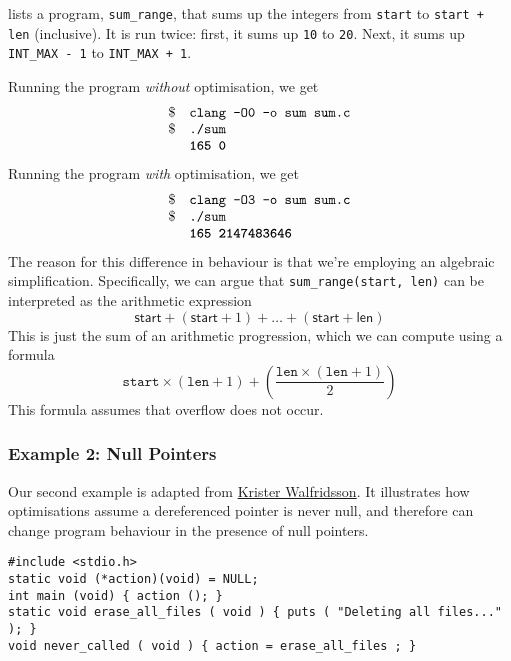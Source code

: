 lists a program, \texttt{sum\_range}, that sums up the integers from \texttt{start} to \texttt{start + len} (inclusive). It is run twice: first, it sums up \texttt{10} to \texttt{20}. Next, it sums up \texttt{INT\_MAX - 1} to \texttt{INT\_MAX + 1}.

Running the program \textit{without} optimisation, we get
\[\begin{array}{ll}
    \$ & \texttt{clang -O0 -o sum sum.c} \\
    \$ & \texttt{./sum} \\
       & \texttt{\textbf{165 0}}
\end{array}\]
Running the program \textit{with} optimisation, we get
\[\begin{array}{ll}
    \$ & \texttt{clang -O3 -o sum sum.c} \\
    \$ & \texttt{./sum} \\
       & \texttt{\textbf{165 2147483646}}
\end{array}\]
The reason for this difference in behaviour is that we're employing an algebraic simplification. Specifically, we can argue that \texttt{sum\_range(start, len)} can be interpreted as the arithmetic expression
\[\textsf{start} + (\textsf{start}+1) + \ldots + (\textsf{start}+\textsf{len})\]
This is just the sum of an arithmetic progression, which we can compute using a formula 
\[\texttt{start} \times (\texttt{len} + 1) + (\frac{\texttt{len}\times(\texttt{len}+1)}{2})\]
This formula assumes that overflow does not occur.

\subsubsection{Example 2: Null Pointers}
Our second example is adapted from \href{https://kristerw.blogspot.com/2017/09/why-undefined-behavior-may-call-never.html}{Krister Walfridsson}. It illustrates how optimisations assume a dereferenced pointer is never null, and therefore can change program behaviour in the presence of null pointers. 

\begin{code}
\label{code:optimisation-np-overflow}
\begin{verbatim}
#include <stdio.h>
static void (*action)(void) = NULL;
int main (void) { action (); }
static void erase_all_files ( void ) { puts ( "Deleting all files..." ); }
void never_called ( void ) { action = erase_all_files ; }
\end{verbatim}
\end{code}

